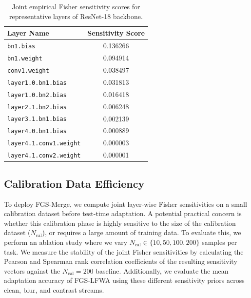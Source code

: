 \documentclass{article}
\theoremstyle{plain}
\theoremstyle{definition}
\theoremstyle{remark}
\begin{document}
\begin{table}[h]
\centering
\caption{Joint empirical Fisher sensitivity scores for representative layers of ResNet-18 backbone.}
\label{tab:layer_sensitivity}
\vskip 0.15in
\begin{small}
\begin{sc}
\begin{tabular}{lc}
\toprule
Layer Name & Sensitivity Score \\
\midrule
\texttt{bn1.bias} & 0.136266 \\
\texttt{bn1.weight} & 0.094914 \\
\texttt{conv1.weight} & 0.038497 \\
\texttt{layer1.0.bn1.bias} & 0.031813 \\
\texttt{layer1.0.bn2.bias} & 0.016418 \\
\texttt{layer2.1.bn2.bias} & 0.006248 \\
\texttt{layer3.1.bn1.bias} & 0.002139 \\
\texttt{layer4.0.bn1.bias} & 0.000889 \\
\texttt{layer4.1.conv1.weight} & 0.000003 \\
\texttt{layer4.1.conv2.weight} & 0.000001 \\
\bottomrule
\end{tabular}
\end{sc}
\end{small}
\vskip -0.1in
\end{table}

\subsection{Calibration Data Efficiency}
\label{submission:results:cal_eff}
To deploy FGS-Merge, we compute joint layer-wise Fisher sensitivities on a small calibration dataset before test-time adaptation. A potential practical concern is whether this calibration phase is highly sensitive to the size of the calibration dataset ($N_{\text{cal}}$), or requires a large amount of training data. To evaluate this, we perform an ablation study where we vary $N_{\text{cal}} \in \{10, 50, 100, 200\}$ samples per task. We measure the stability of the joint Fisher sensitivities by calculating the Pearson and Spearman rank correlation coefficients of the resulting sensitivity vectors against the $N_{\text{cal}} = 200$ baseline. Additionally, we evaluate the mean adaptation accuracy of FGS-LFWA using these different sensitivity priors across clean, blur, and contrast streams.
\end{document}
